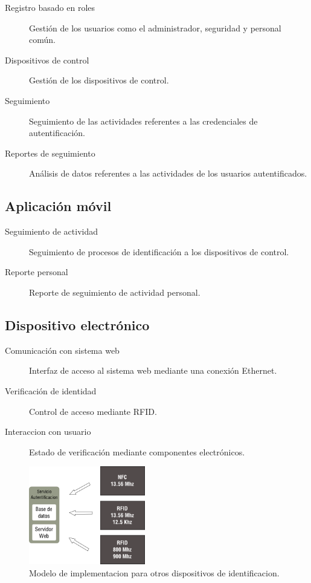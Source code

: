 \documentclass[11pt,twocolumn]{article}
\begin{document}
	\begin{description}
		\item [Registro basado en roles] Gesti\'on de los usuarios como el administrador, seguridad y personal com\'un.
		\item [Dispositivos de control] Gesti\'on de los dispositivos de control.
		\item [Seguimiento] Seguimiento de las actividades referentes a las credenciales de autentificaci\'on.
		\item [Reportes de seguimiento] An\'alisis de datos referentes a las actividades de los usuarios autentificados.
	\end{description}
	
	\subsection{Aplicaci\'on m\'ovil}		
	
	 \begin{description}
		 \item[Seguimiento de actividad] Seguimiento de procesos de identificaci\'on a los dispositivos de control.
		 \item[Reporte personal] Reporte de seguimiento de actividad personal.
	 \end{description}
	
	\subsection{Dispositivo electr\'onico}
	
	 \begin{description}
		 \item[Comunicaci\'on con sistema web] Interfaz de acceso al sistema web mediante una conexi\'on Ethernet.
		 \item[Verificaci\'on de identidad] Control de acceso mediante RFID.
		 \item[Interaccion con usuario] Estado de verificaci\'on mediante componentes electr\'onicos. 		
	 \end{description}			

\begin{figure}[!h]
  \begin{center}
    \includegraphics[width=2in]{architect.png}
  \end{center}

  \caption{\small Modelo de implementacion para otros dispositivos de identificacion.}
  \label{fig-label}
\end{figure}
\end{document}
